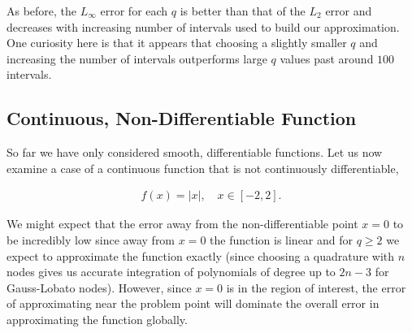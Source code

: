 \documentclass{article}
\begin{document}
\noindent As before, the $L_\infty$ error for each $q$ is better than that of the $L_2$ error and decreases with increasing number of intervals used to build our approximation. One curiosity here is that it appears that choosing a slightly smaller $q$ and increasing the number of intervals outperforms large $q$ values past around $100$ intervals. \newline

\subsection{Continuous, Non-Differentiable Function}
\noindent So far we have only considered smooth, differentiable functions. Let us now examine a case of a continuous function that is not continuously differentiable, 

\begin{align*}
  f(x) = | x | , \quad x \in [-2,2].
\end{align*}

\noindent We might expect that the error away from the non-differentiable point $x = 0$ to be incredibly low since away from $x = 0$ the function is linear and for $q \geq 2$ we expect to approximate the function exactly (since choosing a quadrature with $n$ nodes gives us accurate integration of polynomials of degree up to $2n - 3$ for Gauss-Lobato nodes). However, since $x = 0$ is in the region of interest, the error of approximating near the problem point will dominate the overall error in approximating the function globally. 
\end{document}
